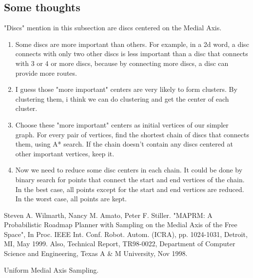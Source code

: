 \documentclass[12pt]{article}
\begin{document}
  \subsection{Some thoughts}
  "Discs" mention in this subsection are discs centered on the Medial Axis.
  \begin{enumerate}
	\item Some discs are more important than others. For example, in a 2d word, a disc connects with only two other discs is less important than a disc that connects with 3 or 4 or more discs, because by connecting more discs, a disc can provide more routes.

    \item I guess those "more important" centers are very likely to form clusters. By clustering them, i think we can do clustering and get the center of each cluster.
	
	\item Choose these "more important" centers as initial vertices of our simpler graph. For every pair of vertices, find the shortest chain of discs that connects them, using A* search. If the chain doesn't contain any discs centered at other important vertices, keep it.
	
	\item Now we need to reduce some disc centers in each chain. It could be done by binary search for points that connect the start and end vertices of the chain. In the best case, all points except for the start and end vertices are reduced. In the worst case, all points are kept.
	
  \end{enumerate}
  
  \begin{thebibliography}{1}

   Steven A. Wilmarth, Nancy M. Amato, Peter F. Stiller. "MAPRM: A Probabilistic Roadmap Planner with Sampling on the Medial Axis of the Free Space", In Proc. IEEE Int. Conf. Robot. Autom. (ICRA), pp. 1024-1031, Detroit, MI, May 1999. Also, Technical Report, TR98-0022, Department of Computer Science and Engineering, Texas A \& M University, Nov 1998.
  
   Uniform Medial Axis Sampling.
   
  \end{thebibliography}
  
\end{document}
